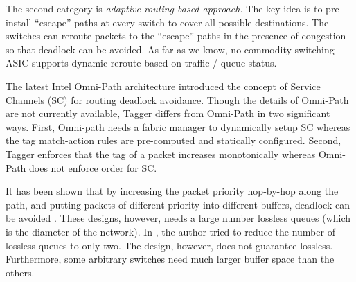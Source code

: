 
The second category is {\em adaptive routing based approach.} The key
idea is to pre-install  ``escape'' paths at every switch to cover all
possible destinations. The switches can reroute packets to the
``escape'' paths in the presence of congestion so that deadlock can be
avoided.
As far as we know, no commodity switching ASIC supports dynamic reroute
based on traffic / queue status.

The latest Intel Omni-Path architecture \cite{omnipath} introduced the
concept of Service Channels (SC) for routing deadlock avoidance. Though
the details of Omni-Path are not currently available, Tagger differs
from Omni-Path in two significant ways. First, Omni-path needs a fabric
manager to dynamically setup SC whereas the tag match-action rules are
pre-computed and statically configured. Second, Tagger enforces that
the tag of a packet increases monotonically whereas Omni-Path does not
enforce order for SC.

It has been shown that by increasing the packet priority hop-by-hop
along the path, and putting packets of different priority into
different buffers, deadlock can be avoided
\cite{firstpaper,survey,datanetworks,karol2003prevention}. These
designs, however, needs a large number lossless queues (which is the
diameter of the network). In \cite{dag}, the author tried to reduce the
number of lossless queues to only two. The design, however, does not
guarantee lossless. Furthermore, some arbitrary switches need much
larger buffer space than the others.

